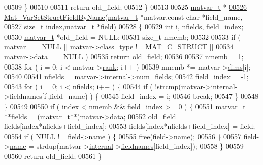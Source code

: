 \begin{DoxyCode}
00509     \}
00510 
00511     \textcolor{keywordflow}{return} old\_field;
00512 \}
00513 
00525 \hyperlink{group___m_a_t_structmatvar__t}{matvar\_t} *
\hyperlink{group___m_a_t_ga702f2b853c605c94a8af50555fc7183b}{00526} \hyperlink{group___m_a_t_ga702f2b853c605c94a8af50555fc7183b}{Mat\_VarSetStructFieldByName}(\hyperlink{group___m_a_t_structmatvar__t}{matvar\_t} *matvar,\textcolor{keyword}{const} \textcolor{keywordtype}{char} *field\_name,
00527     \textcolor{keywordtype}{size\_t} index,\hyperlink{group___m_a_t_structmatvar__t}{matvar\_t} *field)
00528 \{
00529     \textcolor{keywordtype}{int}       i, nfields, field\_index;
00530     \hyperlink{group___m_a_t_structmatvar__t}{matvar\_t} *old\_field = NULL;
00531     \textcolor{keywordtype}{size\_t} nmemb;
00532 
00533     \textcolor{keywordflow}{if} ( matvar == NULL || matvar->\hyperlink{group___m_a_t_aff13035bf3265dd7d9425e5d40c839d4}{class\_type} != \hyperlink{group___m_a_t_ggad4d60ae7b709fc81bfd744fb4c857c40acb467c7749c80902b798134c729bb521}{MAT\_C\_STRUCT} ||
00534          matvar->\hyperlink{group___m_a_t_a5672978efa230bbdecdf38ede781f7fa}{data} == NULL )
00535         \textcolor{keywordflow}{return} old\_field;
00536 
00537     nmemb = 1;
00538     \textcolor{keywordflow}{for} ( i = 0; i < matvar->\hyperlink{group___m_a_t_a84ba70c96ded13cc555fa75b768d9921}{rank}; i++ )
00539         nmemb *= matvar->\hyperlink{group___m_a_t_a8e01234e1c862ce3472bb37f5a09b92c}{dims}[i];
00540 
00541     nfields = matvar->\hyperlink{group___m_a_t_a6e97e3ed9f40c49322c18561c2a94e92}{internal}->\hyperlink{structmatvar__internal_a93fc447484f455eddf9334f2e9e411c2}{num\_fields};
00542     field\_index = -1;
00543     for ( i = 0; i < nfields; i++ ) \{
00544         \textcolor{keywordflow}{if} ( !strcmp(matvar->\hyperlink{group___m_a_t_a6e97e3ed9f40c49322c18561c2a94e92}{internal}->\hyperlink{structmatvar__internal_a7574d000bfc98ad4860ae6590b8d4985}{fieldnames}[i],field\_name) ) \{
00545             field\_index = i;
00546             \textcolor{keywordflow}{break};
00547         \}
00548     \}
00549 
00550     \textcolor{keywordflow}{if} ( index < nmemb && field\_index >= 0 ) \{
00551         \hyperlink{group___m_a_t_structmatvar__t}{matvar\_t} **fields = (\hyperlink{group___m_a_t_structmatvar__t}{matvar\_t}**)matvar->\hyperlink{group___m_a_t_a5672978efa230bbdecdf38ede781f7fa}{data};
00552         old\_field = fields[index*nfields+field\_index];
00553         fields[index*nfields+field\_index] = field;
00554         if ( NULL != field->\hyperlink{group___m_a_t_a5d4b55b041e3b4fb50c04337f05ad909}{name} ) \{
00555             free(field->\hyperlink{group___m_a_t_a5d4b55b041e3b4fb50c04337f05ad909}{name});
00556         \}
00557         field->\hyperlink{group___m_a_t_a5d4b55b041e3b4fb50c04337f05ad909}{name} = strdup(matvar->\hyperlink{group___m_a_t_a6e97e3ed9f40c49322c18561c2a94e92}{internal}->\hyperlink{structmatvar__internal_a7574d000bfc98ad4860ae6590b8d4985}{fieldnames}[field\_index]);
00558     \}
00559 
00560     \textcolor{keywordflow}{return} old\_field;
00561 \}
\end{DoxyCode}

